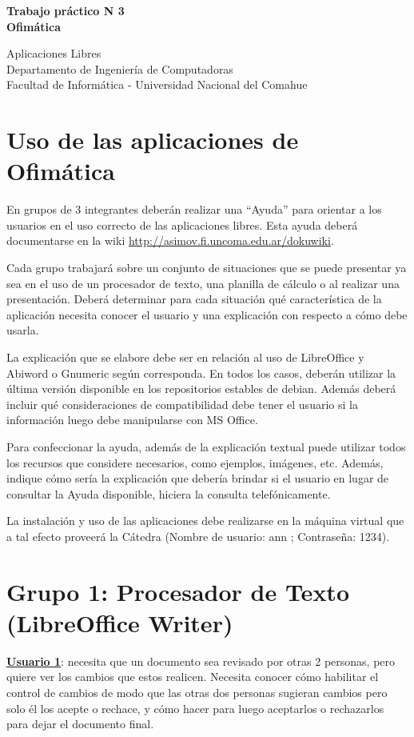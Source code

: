 \documentclass[12pt]{article}
\def\maketitle{

 \makeatletter
 {\color{bl} \centering \huge \sc \textbf{
Trabajo práctico N 3 \\
\large \vspace*{-8pt} \color{black} Ofimática
 \vspace*{8pt} }\par}
 \makeatother


 \makeatletter
 {\centering \small 
	Aplicaciones Libres\\
 	Departamento de Ingeniería de Computadoras \\
 	Facultad de Informática - Universidad Nacional del Comahue \\
 	\vspace{20pt} }
 \makeatother

}
\begin{document}
\thispagestyle{empty}
\maketitle
\setlength{\parindent}{0pt}

\section*{Uso de las aplicaciones de Ofimática}  

En grupos de 3 integrantes deberán realizar una ``Ayuda'' para orientar a los usuarios en el uso correcto de las aplicaciones libres. Esta ayuda deberá documentarse en la wiki \url{http://asimov.fi.uncoma.edu.ar/dokuwiki}.

Cada grupo trabajará sobre un conjunto de situaciones que se puede presentar ya sea en el uso de un procesador de texto, una planilla de cálculo o al realizar una presentación. Deberá determinar para cada situación qué característica de la aplicación necesita conocer el usuario y una explicación con respecto a cómo debe usarla.  

La explicación que se elabore debe ser en relación al uso de LibreOffice y Abiword o Gnumeric según corresponda. En todos los casos, deberán utilizar la última versión disponible en los repositorios estables de debian. Además deberá incluir qué consideraciones de compatibilidad debe tener el usuario si la información luego debe manipularse con MS Office.

Para confeccionar la ayuda, además de la explicación textual puede utilizar todos los recursos que considere necesarios, como ejemplos, imágenes, etc. Además, indique cómo sería la explicación que debería brindar si el usuario en lugar de consultar la Ayuda disponible, hiciera la consulta telefónicamente.

La instalación y uso de las aplicaciones debe realizarse en la máquina virtual que a tal efecto proveerá la Cátedra (Nombre de usuario: ann ; Contraseña: 1234).

\section*{\textbf{Grupo 1: Procesador de Texto (LibreOffice Writer)}}

\textbf{\underline{Usuario 1}}: necesita que un documento sea revisado por otras 2 personas, pero quiere ver los cambios que estos realicen. Necesita conocer cómo habilitar el control de cambios de modo que las otras dos personas sugieran cambios pero solo él los acepte o rechace, y cómo hacer para luego  aceptarlos o rechazarlos para dejar el documento final.
\end{document}
